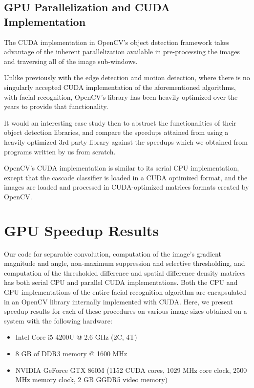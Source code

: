 \documentclass[journal]{IEEEtran}
\begin{document}
\subsection{GPU Parallelization and CUDA Implementation}
The CUDA implementation in OpenCV's object detection framework takes advantage of the inherent parallelization available in pre-processing the images and traversing all of the image sub-windows.
\par Unlike previously with the edge detection and motion detection, where there is no singularly accepted CUDA implementation of the aforementioned algorithms, with facial recognition, OpenCV's library has been heavily optimized over the years to provide that functionality.
\par It would an interesting case study then to abstract the functionalities of their object detection libraries, and compare the speedups attained from using a heavily optimized 3rd party library against the speedups which we obtained from programs written by us from scratch.
\par OpenCV's CUDA implementation is similar to its serial CPU implementation, except that the cascade classifier is loaded in a CUDA optimized format, and the images are loaded and processed in CUDA-optimized matrices formats created by OpenCV. 


\section{GPU Speedup Results}
\label{results}
Our code for separable convolution, computation of the image's gradient magnitude and angle, non-maximum suppression and selective thresholding, and computation of the thresholded difference and spatial difference density matrices has both serial CPU and parallel CUDA implementations. Both the CPU and GPU implementations of the entire facial recognition algorithm are encapsulated in an OpenCV library internally implemented with CUDA. Here, we present speedup results for each of these procedures on various image sizes obtained on a system with the following hardware:
\begin{itemize}
	\item Intel Core i5 4200U @ 2.6 GHz (2C, 4T)
	\item 8 GB of DDR3 memory @ 1600 MHz
	\item NVIDIA GeForce GTX 860M (1152 CUDA cores, 1029 MHz core clock, 2500 MHz memory clock, 2 GB GGDR5 video memory)
\end{itemize}
\end{document}

